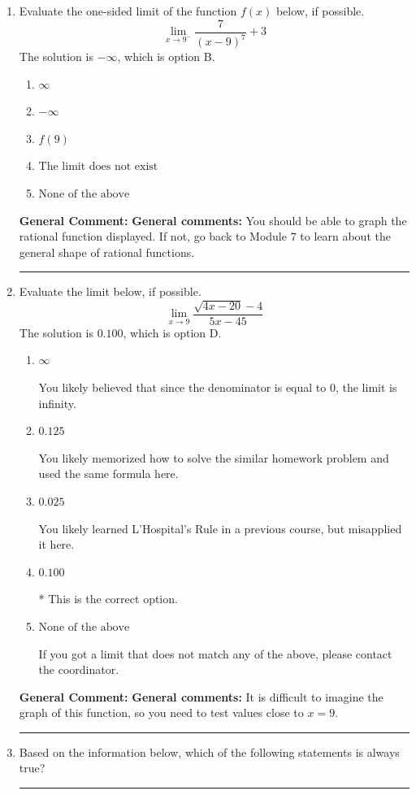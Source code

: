 \documentclass{extbook}[14pt]
\newcommand{\litem}[1]{\item #1

\rule{\textwidth}{0.4pt}}
\begin{document}
\begin{enumerate}\litem{
Evaluate the one-sided limit of the function $f(x)$ below, if possible.
\[ \lim_{x \rightarrow 9^-} \frac{7}{(x-9)^7}+3 \]The solution is \( -\infty \), which is option B.\begin{enumerate}[label=\Alph*.]
\item \( \infty \)


\item \( -\infty \)


\item \( f(9) \)


\item \( \text{The limit does not exist} \)


\item \( \text{None of the above} \)


\end{enumerate}

\textbf{General Comment:} \textbf{General comments:} You should be able to graph the rational function displayed. If not, go back to Module 7 to learn about the general shape of rational functions.
}
\litem{
Evaluate the limit below, if possible.
\[ \lim_{x \rightarrow 9} \frac{\sqrt{4x - 20} - 4}{5x - 45} \]The solution is \( 0.100 \), which is option D.\begin{enumerate}[label=\Alph*.]
\item \( \infty \)

You likely believed that since the denominator is equal to 0, the limit is infinity.
\item \( 0.125 \)

You likely memorized how to solve the similar homework problem and used the same formula here.
\item \( 0.025 \)

You likely learned L'Hospital's Rule in a previous course, but misapplied it here.
\item \( 0.100 \)

* This is the correct option.
\item \( \text{None of the above} \)

If you got a limit that does not match any of the above, please contact the coordinator.
\end{enumerate}

\textbf{General Comment:} \textbf{General comments:} It is difficult to imagine the graph of this function, so you need to test values close to $x = 9$.
}
\litem{
Based on the information below, which of the following statements is always true?

}
\end{enumerate}
\end{document}
